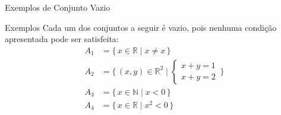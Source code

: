 \documentclass[9pt]{beamer}
\begin{document}
\begin{frame}{Exemplos de Conjunto Vazio}

\begin{block}{Exemplos}
Cada um dos conjuntos a seguir é vazio, pois nenhuma condição apresentada pode ser satisfeita:
\[
\begin{aligned}
A_1 &= \{\, x \in \mathbb{R} \mid x \neq x \,\} \\[4pt]
A_2 &= \{\, (x,y) \in \mathbb{R}^2 \mid 
\begin{cases}
x + y = 1 \\
x + y = 2
\end{cases} \,\} \\[6pt]
A_3 &= \{\, x \in \mathbb{N} \mid x < 0 \,\} \\[4pt]
A_4 &= \{\, x \in \mathbb{R} \mid x^2 < 0 \,\} \\[4pt]
\end{aligned}
\]
\end{block}

\end{frame} 
 
\end{document}
